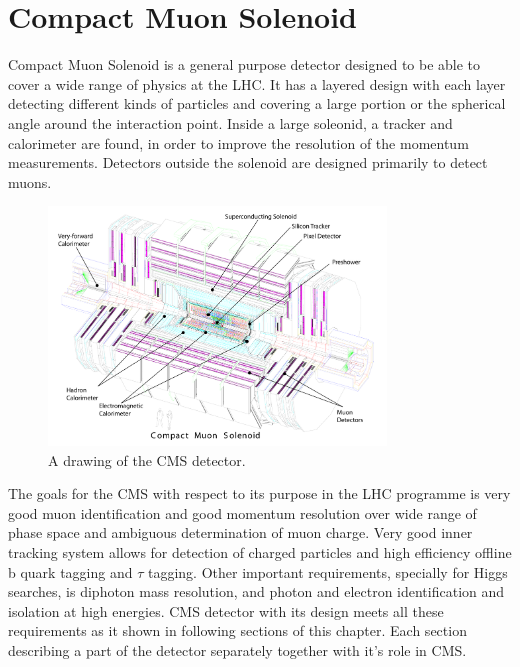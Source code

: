 \chapter{Compact Muon Solenoid} %

\label{Chapter4} %


Compact Muon Solenoid is a general purpose detector designed to be able to cover a wide range of physics at the LHC. It has a layered design with each layer detecting different kinds of particles and covering a large portion or the spherical angle around the interaction point. Inside a large soleonid, a tracker and calorimeter are found, in order to improve the resolution of the momentum measurements. Detectors outside the solenoid are designed primarily to detect muons.  \\

\begin{figure}[htbp]
	\centering
		\includegraphics[width=0.8\textwidth]{Figures/CMS.pdf}
	\caption[CMS detector]{A drawing of the CMS detector. \cite{Chatrchyan:2008aa}}
	\label{fig:CMS}
\end{figure}
\par The goals for the CMS with respect to its purpose in the LHC programme is very good muon identification and good momentum resolution over wide range of phase space and ambiguous determination of muon charge. Very good inner tracking system allows for detection of charged particles and high efficiency offline b quark tagging and $\tau$ tagging. Other important requirements, specially for Higgs searches, is diphoton mass resolution, and photon and electron identification and isolation at high energies. 
CMS detector with its design meets all these requirements as it shown in following sections of this chapter.  Each section describing a part of the detector separately together with it's role in CMS.  

